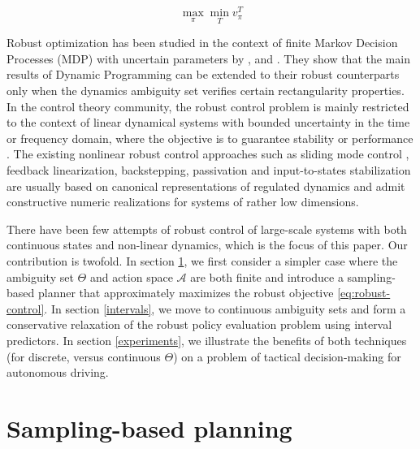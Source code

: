\documentclass{article}
\begin{document}
\vspace{-5mm}
\begin{equation}
\label{eq:robust-control}
\max_\pi \min_T v^T_\pi
\end{equation}

\vspace{-3mm}
\noindent
Robust optimization has been studied in the context of finite Markov Decision Processes (MDP) with uncertain parameters by \citet{Iyengar2005}, \citet{Nilim2005} and \citet{Wiesemann2013}. They show that the main results of Dynamic Programming can be extended to their robust counterparts only when the dynamics ambiguity set verifies certain rectangularity properties. In the control theory community, the robust control problem is mainly restricted to the context of linear dynamical systems with bounded uncertainty in the time or frequency domain, where the objective is to guarantee stability \citep[e.g. $\mathcal{H}_\infty$-optimal control, see][]{Basar1996} or performance \citep[e.g. LQ optimal control theory, see][]{Petersen2014}. The existing nonlinear robust control approaches such as sliding mode control \citep{Li2018}, feedback linearization, backstepping, passivation and input-to-states stabilization \citep{Khalil2015} are usually based on canonical representations of regulated dynamics and admit constructive numeric realizations for systems of rather low dimensions.

\vspace{-1mm}
There have been few attempts of robust control of large-scale systems with both continuous states and non-linear dynamics, which is the focus of this paper. Our contribution is twofold. In section \ref{sampling}, we first consider a simpler case where the ambiguity set $\Theta$ and action space $\mathcal{A}$ are both finite and introduce a sampling-based planner that approximately maximizes the robust objective \eqref{eq:robust-control}. In section \ref{intervals}, we move to continuous ambiguity sets and form a conservative relaxation of the robust policy evaluation problem using interval predictors. In section \ref{experiments}, we illustrate the benefits of both techniques (for discrete, versus continuous $\Theta$) on a problem of tactical decision-making for autonomous driving.

\vspace{-4mm}
\section{Sampling-based planning}
\label{sampling}
\end{document}
